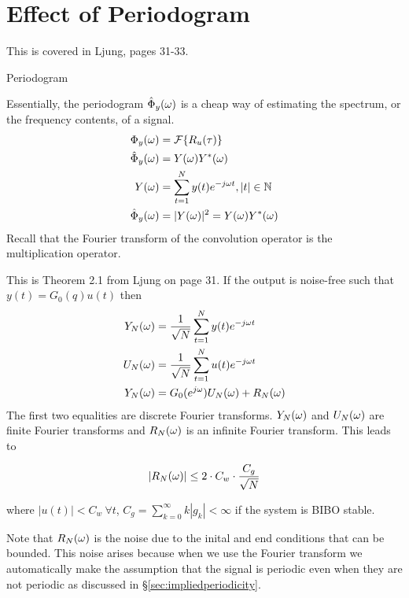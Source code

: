 \section{Effect of Periodogram}
This is covered in Ljung, pages 31-33.%
\begin{definition}{Periodogram}

Essentially, the periodogram $\hat{\Phi}_y(\omega)$ is a cheap way of estimating the spectrum, or the frequency contents, of a signal.
\begin{align*}
\Phi_y(\omega) &= \mathcal{F}\{R_u(\tau)\} \\
\hat{\Phi}_y(\omega) &= Y(\omega)Y^\ast(\omega) \\
Y(\omega) &= \sum_{t=1}^N y(t)e^{-j\omega t}, |t|\in\mathbb{N} \\
\hat{\Phi}_y(\omega) &= |Y(\omega)|^2 = Y(\omega)Y^\ast(\omega)
\end{align*}
Recall that the Fourier transform of the convolution operator is the multiplication operator.
\end{definition}

\begin{theorem}
This is Theorem 2.1 from Ljung on page 31.
If the output is noise-free such that $y(t)=G_0(q)u(t)$ then
\begin{align*}
Y_N(\omega) &= \frac{1}{\sqrt{N}}\sum_{t=1}^N y(t)e^{-j\omega t} \\
U_N(\omega) &= \frac{1}{\sqrt{N}}\sum_{t=1}^N u(t)e^{-j\omega t} \\
Y_N(\omega) &= G_0(e^{j\omega})U_N(\omega) + R_N(\omega)
\end{align*}
The first two equalities are discrete Fourier transforms.
$Y_N(\omega)$ and $U_N(\omega)$ are finite Fourier transforms and $R_N(\omega)$ is an infinite Fourier transform.
This leads to

\begin{equation*}
|R_N(\omega)| \leq 2\cdot C_w\cdot \frac{C_g}{\sqrt{N}}
\end{equation*}

where $|u(t)|<C_w~\forall t$, $C_g=\sum_{k=0}^\infty k|g_k|<\infty$ if the system is BIBO stable.
\end{theorem}
Note that $R_N(\omega)$ is the noise due to the inital and end conditions that can be bounded.
This noise arises because when we use the Fourier transform we automatically make the assumption that the signal is periodic even when they are not periodic as discussed in \S\ref{sec:impliedperiodicity}.
